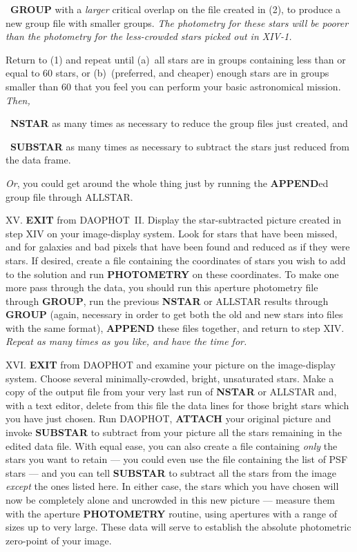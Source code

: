 ~{\bf GROUP} with a {\it larger\/} critical overlap on
the file created in (2), to produce a new group file with smaller
groups. {\it The photometry for these stars will be poorer than the
photometry for the less-crowded stars picked out in XIV-1.\/}

\item{}Return to (1) and repeat until (a)~all stars are in
groups containing less than or equal to 60 stars, or (b)~(preferred,
and cheaper) enough stars are in groups smaller than 60 that you feel
you can perform your basic astronomical mission.  {\it Then,\/}

~{\bf NSTAR} as many times as necessary to reduce the
group files just created, and

~{\bf SUBSTAR} as many times as necessary to subtract the
stars just reduced from the data frame.

\item{} {\it Or\/}, you could get around the whole thing just by
running the {\bf APPEND}ed group file through ALLSTAR.

\item{XV.} {\bf EXIT} from DAOPHOT~II.  Display the star-subtracted
picture created in step XIV on your image-display system. Look for
stars that have been missed, and for galaxies and bad pixels that have
been found and reduced as if they were stars.  If desired, create a
file containing the coordinates of stars you wish to add to the
solution and run {\bf PHOTOMETRY} on these coordinates.  To make one
more pass through the data, you should run this aperture photometry
file through {\bf GROUP}, run the previous {\bf NSTAR} or ALLSTAR
results through {\bf GROUP} (again, necessary in order to get both the
old and new stars into files with the same format), {\bf APPEND} these
files together, and return to step XIV.  {\it Repeat as many times as
you like, and have the time for.}

\item{XVI.}  {\bf EXIT} from DAOPHOT and examine your picture on the
image-display system.  Choose several minimally-crowded, bright,
unsaturated stars.  Make a copy of the output file from your very last
run of {\bf NSTAR} or ALLSTAR and, with a text editor, delete
from this file the data lines for those bright stars which you have
just chosen.  Run DAOPHOT, {\bf ATTACH} your original picture and
invoke {\bf SUBSTAR} to subtract from your picture all the stars
remaining in the edited data file.  With equal ease, you can also
create a file containing {\it only\/} the stars you want to retain ---
you could even use the file containing the list of PSF stars --- and
you can tell {\bf SUBSTAR} to subtract all the stars from the image
{\it except\/} the ones listed here.  In either case, the stars which
you have chosen will now be completely alone and uncrowded in this new
picture --- measure them with the aperture {\bf PHOTOMETRY} routine,
using apertures with a range of sizes up to very large. These data will
serve to establish the absolute photometric zero-point of your image.

